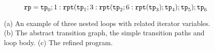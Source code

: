 \begin{figure}
\begin{subfigure}{.9\textwidth}
\begin{centering}
  $\mathtt{rp} = \mathtt{tp}_0; 1: \mathtt{rpt}(\mathtt{tp}_1; 3: {\mathtt{rpt}(\mathtt{tp}_2; 6 : {\mathtt{rpt}(\mathtt{tp}_3)}; \mathtt{tp}_4)}; \mathtt{tp}_5);\mathtt{tp}_6$
  \caption{}
  \end{centering}
  \end{subfigure}
  \vspace{-0.3cm}
\caption{
      (a) An example of three nested loops with related iterator variables.
      (b) The abstract transition graph, the simple transition paths and loop body.
      (c) The refined program.}
\label{fig:threeWhile-looprb}
\vspace{-0.3cm}
\end{figure}